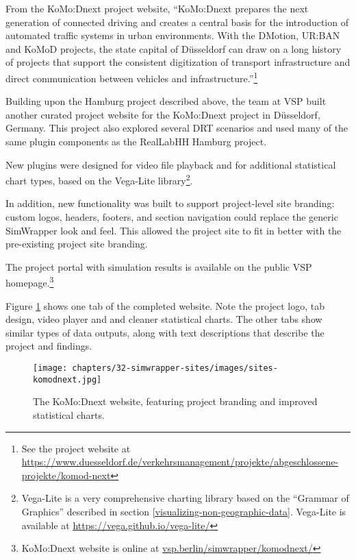 From the KoMo:Dnext project website, ``KoMo:Dnext prepares the next generation of connected driving and creates a central basis for the introduction of automated traffic systems in urban environments. With the DMotion, UR:BAN and KoMoD projects, the state capital of Düsseldorf can draw on a long history of projects that support the consistent digitization of transport infrastructure and direct communication between vehicles and infrastructure.''\footnote{See the project website at \url{https://www.duesseldorf.de/verkehrsmanagement/projekte/abgeschlossene-projekte/komod-next}}

Building upon the Hamburg project described above, the team at VSP built another curated project website for the KoMo:Dnext project in Düsseldorf, Germany. This project also explored several \gls{DRT} scenarios and used many of the same plugin components as the RealLabHH Hamburg project.

New plugins were designed for video file playback and for additional statistical chart types, based on the Vega-Lite library\footnote{Vega-Lite is a very comprehensive charting library based on the ``Grammar of Graphics'' described in section \ref{visualizing-non-geographic-data}. Vega-Lite is available at \url{https://vega.github.io/vega-lite/}}.

In addition, new functionality was built to support project-level site branding: custom logos, headers, footers, and section navigation could replace the generic SimWrapper look and feel. This allowed the project site to fit in better with the pre-existing project site branding.

The project portal with simulation results is available on the public VSP homepage.\footnote{KoMo:Dnext website is online at \href{https://vsp.berlin/simwrapper/komodnext/}{vsp.berlin/simwrapper/komodnext/}}

Figure \ref{fig:sites-komodnext} shows one tab of the completed website. Note the project logo, tab design, video player and and cleaner statistical charts. The other tabs show similar types of data outputs, along with text descriptions that describe the project and findings.

\begin{figure}[ht]
  \centering
  \texttt{[image: chapters/32-simwrapper-sites/images/sites-komodnext.jpg]}
  \caption{The KoMo:Dnext website, featuring project branding and improved statistical charts.}
  \label{fig:sites-komodnext}
\end{figure}

